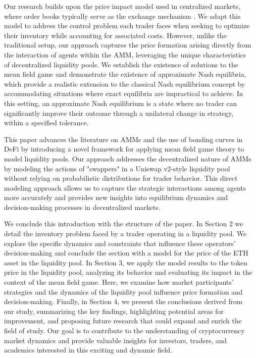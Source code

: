 \documentclass[11pt]{article}
\theoremstyle{definition}
\begin{document}

Our research builds upon the price impact model used in centralized markets, where order books typically serve as the exchange mechanism \citep{carmona2015weakmfgformulation}. We adapt this model to address the control problem each trader faces when seeking to optimize their inventory while accounting for associated costs. However, unlike the traditional setup, our approach captures the price formation arising directly from the interaction of agents within the AMM, leveraging the unique characteristics of decentralized liquidity pools. We establish the existence of solutions to the mean field game and demonstrate the existence of approximate Nash equilibria, which provide a realistic extension to the classical Nash equilibrium concept by accommodating situations where exact equilibria are impractical to achieve. In this setting, an approximate Nash equilibrium is a state where no trader can significantly improve their outcome through a unilateral change in strategy, within a specified tolerance.

This paper advances the literature on AMMs and the use of bonding curves in DeFi by introducing a novel framework for applying mean field game theory to model liquidity pools. Our approach addresses the decentralized nature of AMMs by modeling the actions of "swappers" in a Uniswap v2-style liquidity pool without relying on probabilistic distributions for trader behavior. This direct modeling approach allows us to capture the strategic interactions among agents more accurately and provides new insights into equilibrium dynamics and decision-making processes in decentralized markets.

We conclude this introduction with the structure of the paper. In Section 2 we detail the inventory problem faced by a trader operating in a liquidity pool. We explore the specific dynamics and constraints that influence these operators' decision-making and conclude the section with a model for the price of the ETH asset in the liquidity pool.
In Section 3, we apply the model results to the token price in the liquidity pool, analyzing its behavior and evaluating its impact in the context of the mean field game. Here, we  examine how market participants' strategies and the dynamics of the liquidity pool influence price formation and decision-making. 
Finally, in Section 4, we present the conclusions derived from our study, summarizing the key findings, highlighting potential areas for improvement, and proposing future research that could expand and enrich the field of study. Our goal is to contribute to the understanding of cryptocurrency market dynamics and provide valuable insights for investors, traders, and academics interested in this exciting and dynamic field.
\end{document}
